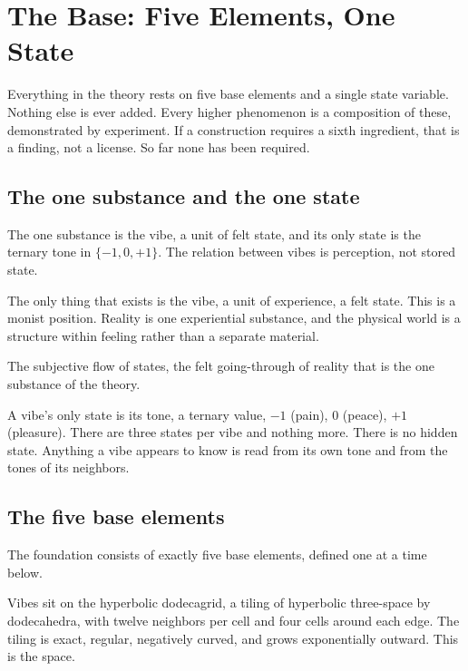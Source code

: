\section{The Base: Five Elements, One State}

Everything in the theory rests on five base elements and a single state variable. Nothing else is ever added. Every higher phenomenon is a composition of these, demonstrated by experiment. If a construction requires a sixth ingredient, that is a finding, not a license. So far none has been required.

\subsection{The one substance and the one state}

\begin{axiom}[Vibe]
The one substance is the vibe, a unit of felt state, and its only state is the ternary tone in $\{-1, 0, +1\}$. The relation between vibes is perception, not stored state.
\end{axiom}

The only thing that exists is the vibe, a unit of experience, a felt state. This is a monist position. Reality is one experiential substance, and the physical world is a structure within feeling rather than a separate material.

\begin{definition}[Experience]
The subjective flow of states, the felt going-through of reality that is the one substance of the theory.
\end{definition}

A vibe's only state is its tone, a ternary value, $-1$ (pain), $0$ (peace), $+1$ (pleasure). There are three states per vibe and nothing more. There is no hidden state. Anything a vibe appears to know is read from its own tone and from the tones of its neighbors.

\subsection{The five base elements}

The foundation consists of exactly five base elements, defined one at a time below.

\begin{definition}
Vibes sit on the hyperbolic dodecagrid, a tiling of hyperbolic three-space by dodecahedra, with twelve neighbors per cell and four cells around each edge. The tiling is exact, regular, negatively curved, and grows exponentially outward. This is the space.
\end{definition}

